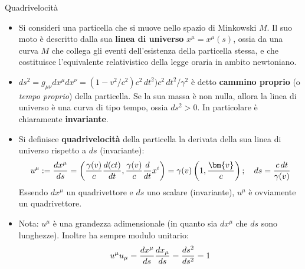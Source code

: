 \documentclass[a4_2,grid,frame]{flashcards}
\newenvironment{cartaflash}
    {\vspace{-15pt}
    \begin{itemize}
    }
    {
    \end{itemize}
    }
\begin{document}
\begin{flashcard}[Definizione]{Quadrivelocità}
\begin{cartaflash}
\item Si consideri una particella che si muove nello spazio di Minkowski $M$. Il suo moto è descritto dalla sua \textbf{linea di universo} $x^\mu = x^\mu(s)$, ossia da una curva $M$ che collega gli eventi dell'esistenza della particella stessa, e che costituisce l'equivalente relativistico della legge oraria in ambito newtoniano.
\vspace{-8pt}
\item $ds^2 = g_{\mu\nu}dx^\mu dx^\nu = (1-v^2/c^2)c^2\,dt^2 ) c^2\,dt^2/\gamma^2$ è detto \textbf{cammino proprio} (o \textit{tempo proprio}) della particella. Se la sua massa è non nulla, allora la linea di universo è una curva di tipo tempo, ossia $ds^2 > 0$. In particolare è chiaramente \textbf{invariante}.
\vspace{-8pt}
\item Si definisce \textbf{quadrivelocità} della particella la derivata della sua linea di universo rispetto a $ds$ (invariante):
\vspace{-8pt}
\[
u^\mu := \frac{dx^\mu}{ds} = \left (\frac{\gamma(v)}{c}\frac{d(ct)}{dt}, \frac{\gamma(v)}{c} \frac{d}{dt}x^i \right ) = \gamma(v) \left ( 1, \frac{\bm{v}}{c}\right ); \quad ds=\frac{c\,dt}{\gamma(v)}
\vspace{-8pt}
\]
Essendo $dx^\mu$ un quadrivettore e $ds$ uno scalare (invariante), $u^\mu$ è ovviamente un quadrivettore.
\vspace{-8pt}
\item Nota: $u^\mu$ è una grandezza adimensionale (in quanto sia $dx^\mu$ che $ds$ sono lunghezze). Inoltre ha sempre modulo unitario:
\vspace{-8pt}
\[
u^\mu u_\mu = \frac{dx^\mu}{ds}\frac{dx_\mu}{ds} = \frac{ds^2}{ds^2} = 1
\vspace{-8pt}
\]
\end{cartaflash}
\end{flashcard}
\end{document}
